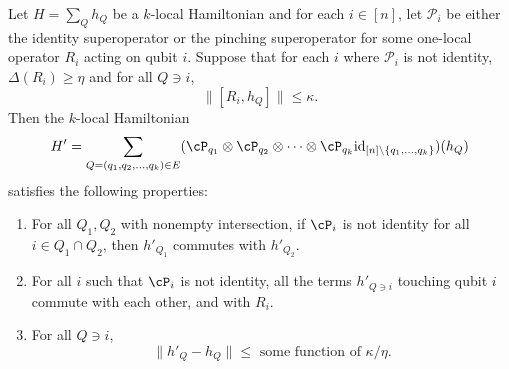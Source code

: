 \begin{lemma}\label{lemma:extra-extra-cheese}
    Let $H = \sum_{Q} h_{Q}$ be a $k$-local Hamiltonian and for each $i \in [n]$, let $\mathcal{P}_i$ be either the identity superoperator or the pinching superoperator for some one-local operator $R_i$ acting on qubit $i$. Suppose that for each $i$ where $\mathcal{P}_i$ is not identity, $\Delta(R_i) \geq \eta$ and for all $Q \ni i$, 
    \[ \|[R_i, h_{Q} ] \| \leq \kappa.\]
    Then the $k$-local Hamiltonian
    \begin{equation}\label{eqn:definition-of-H-prime}
        H' = \sum_{Q = (q_1, q_2, \dots, q_k) \in E} (\cP_{q_1} \otimes \cP_{q_2} \otimes \dots \otimes \cP_{q_k} \mathrm{id}_{[n]\setminus \{q_1, \dots, q_k\}})( h_{Q})
    \end{equation}
    satisfies the following properties:
    \begin{enumerate}
    \item {} For all $Q_1, Q_2$ with nonempty intersection, if $\cP_i$ is not identity for all $i \in Q_1 \cap Q_2$, then $h'_{Q_1}$ commutes with $h'_{Q_2}$.
        \item For all $i$ such that $\cP_i$ is not identity, all the terms $h'_{Q \ni i}$ touching qubit $i$ commute with each other, and with $R_i$.
        \item For all $Q \ni i$,
        \begin{equation} \| h'_{Q} - h_{Q} \| \leq \text{ some function of }\kappa/\eta. \label{eq:extra-extra-cheese-rounding-error} \end{equation}
    \end{enumerate}
\end{lemma}
